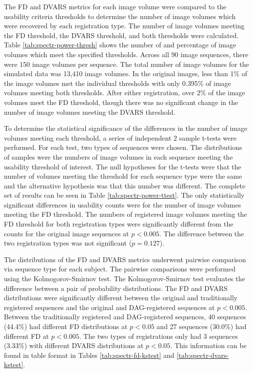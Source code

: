 The FD and DVARS metrics for each image volume were compared to the usability criteria thresholds to determine the number of image volumes which were recovered by each registration type. The number of image volumes meeting the FD threshold, the DVARS threshold, and both thresholds were calculated. Table \ref{tab:spectr-power-thresh} shows the number of and percentage of image volumes which meet the specified thresholds. Across all 90 image sequences, there were 150 image volumes per sequence. The total number of image volumes for the simulated data was 13,410 image volumes. In the original images, less than 1\% of the image volumes met the individual thresholds with only 0.395\% of image volumes meeting both thresholds. After either registration, over 2\% of the image volumes meet the FD threshold, though there was no significant change in the number of image volumes meeting the DVARS threshold.

To determine the statistical significance of the differences in the number of image volumes meeting each threshold, a series of independent 2 sample t-tests were performed. For each test, two types of sequences were chosen. The distributions of samples were the numbers of image volumes in each sequence meeting the usability threshold of interest. The null hypotheses for the t-tests were that the number of volumes meeting the threshold for each sequence type were the same and the alternative hypothesis was that this number was different. The complete set of results can be seen in Table \ref{tab:spectr-power-ttest}. The only statistically significant differences in usability counts were for the number of image volumes meeting the FD threshold. The numbers of registered image volumes meeting the FD threshold for both registration types were significantly different from the counts for the original image sequences at $p < 0.005$. The difference between the two registration types was not significant ($p = 0.127$).

The distributions of the FD and DVARS metrics underwent pairwise comparison via sequence type for each subject. The pairwise comparisons were performed using the Kolmogorov-Smirnov test. The Kolmogorov-Smirnov test evaluates the difference between a pair of probability distributions. The FD and DVARS distributions were significantly different between the original and traditionally registered sequences and the original and DAG-registered sequences at $p < 0.005$. Between the traditionally registered and DAG-registered sequences, 40 sequences (44.4\%) had different FD distributions at $p < 0.05$ and 27 sequences (30.0\%) had different FD at $p < 0.005$. The two types of registrations only had 3 sequences (3.33\%) with different DVARS distributions at $p < 0.05$. This information can be found in table format in Tables \ref{tab:spectr-fd-kstest} and \ref{tab:spectr-dvars-kstest}.

